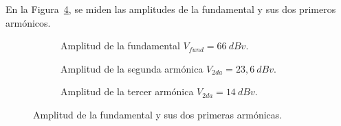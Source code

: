      En la Figura~\ref{fig:Exp7AmplFundYArmonicasLA}, se miden las amplitudes de la fundamental y sus 
      dos primeros armónicos.

    \begin{figure}[H]
        \centering
        \begin{subfigure}[H]{0.48\textwidth}
          \caption{Amplitud de la fundamental $V_{fund}=66~dBv$.}
          \label{fig:Exp7AmpFundamentalLA}
        \end{subfigure}
        \hfill 
        \begin{subfigure}[H]{0.48\textwidth}
          \caption{Amplitud de la segunda armónica $V_{2da}=23,6~dBv$.}
          \label{fig:Exp7AmpSegundaLA}
        \end{subfigure}     
        \begin{subfigure}[H]{0.48\textwidth}
          \caption{Amplitud de la tercer armónica $V_{2da}=14~dBv$.}
          \label{fig:Exp7AmpTercerLA}
        \end{subfigure}   
        \caption{Amplitud de la fundamental y sus dos primeras armónicas.}
        \label{fig:Exp7AmplFundYArmonicasLA}
      \end{figure}

